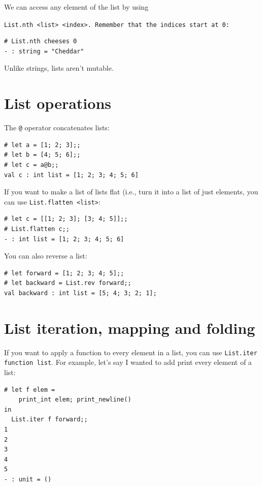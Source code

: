 \documentclass[10pt]{book}
\begin{document}
We can access any element of the list by using {\tt List.nth <list> <index>. 
Remember that the indices start at 0:

\beforeverb
\begin{verbatim}
# List.nth cheeses 0
- : string = "Cheddar"
\end{verbatim}
\afterverb
%
Unlike strings, lists aren't mutable.

\section{List operations}

The {\tt @} operator concatenates lists:


\beforeverb
\begin{verbatim}
# let a = [1; 2; 3];;
# let b = [4; 5; 6];;
# let c = a@b;;
val c : int list = [1; 2; 3; 4; 5; 6]
\end{verbatim}
\afterverb
%

If you want to make a list of lists flat (i.e., turn it into a list of 
just elements, you can use {\tt List.flatten <list>}:

\beforeverb
\begin{verbatim}
# let c = [[1; 2; 3]; [3; 4; 5]];;
# List.flatten c;;
- : int list = [1; 2; 3; 4; 5; 6]
\end{verbatim}
\afterverb

You can also reverse a list:

\beforeverb
\begin{verbatim}
# let forward = [1; 2; 3; 4; 5];;
# let backward = List.rev forward;;
val backward : int list = [5; 4; 3; 2; 1];
\end{verbatim}
\afterverb

\section{List iteration, mapping and folding}

If you want to apply a function to every element in a list, 
you can use {\tt List.iter function list}. For example, let's say I wanted 
to add print every element of a list:

\beforeverb
\begin{verbatim}
# let f elem = 
    print_int elem; print_newline()
in
  List.iter f forward;;
1
2
3
4
5
- : unit = ()
\end{verbatim}
\afterverb

}
\end{document}
